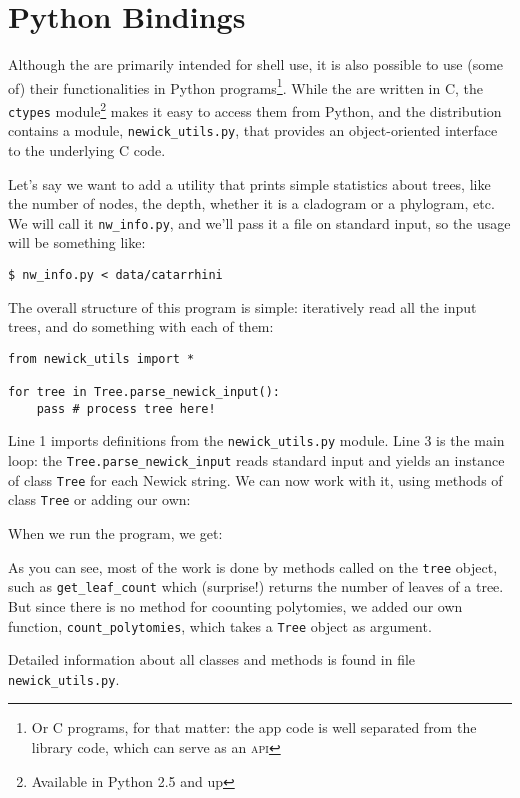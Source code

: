 
\chapter{Python Bindings}
\label{chap_python_lib}

Although the \nutils{} are primarily intended for shell use, it is also
possible to use (some of) their functionalities in Python programs\footnote{Or
C programs, for that matter: the app code is well separated from the library
code, which can serve as an \textsc{api}}. While the \nutils{} are written in
C, the \texttt{ctypes} module\footnote{Available in Python 2.5 and up} makes it
easy to access them from Python, and the distribution contains a module,
\texttt{newick\_utils.py}, that provides an object-oriented interface to the
underlying C code.

Let's say we want to add a utility that prints simple statistics about trees,
like the number of nodes, the depth, whether it is a cladogram or a phylogram,
etc. We will call it \texttt{nw\_info.py}, and we'll pass it a \nw{}
file on standard input, so the usage will be something like:

\begin{verbatim}
$ nw_info.py < data/catarrhini
\end{verbatim}

\noindent{}The overall structure of this program is simple: iteratively read
all the input trees, and do something with each of them:

\begin{lstlisting}
from newick_utils import *

for tree in Tree.parse_newick_input():
    pass # process tree here!
\end{lstlisting}

\noindent{}Line 1 imports definitions from the \texttt{newick\_utils.py}
module. Line 3 is the main loop: the \texttt{Tree.parse\_newick\_input}
reads standard input and yields an instance of class \texttt{Tree} for each
Newick string. We can now work with it, using methods of class \texttt{Tree} or adding our own:



\noindent{}When we run the program, we get:




As you can see, most of the work is done by methods called on the \texttt{tree}
object, such as \texttt{get\_leaf\_count} which (surprise!) returns the number
of leaves of a tree. But since there is no method for coounting polytomies, we
added our own function, \texttt{count\_polytomies}, which takes a \texttt{Tree}
object as argument.

Detailed information about all classes and methods is found in file
\texttt{newick\_utils.py}.
